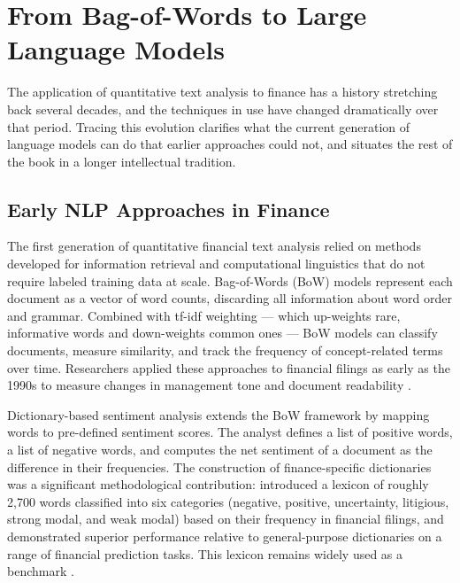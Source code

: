 \section{From Bag-of-Words to Large Language Models}
\label{sec:bow-to-llms}

The application of quantitative text analysis to finance has a history
stretching back several decades, and the techniques in use have changed
dramatically over that period.  Tracing this evolution clarifies what
the current generation of language models can do that earlier approaches
could not, and situates the rest of the book in a longer intellectual
tradition.

\subsection{Early NLP Approaches in Finance}
\label{subsec:early-nlp-finance}

The first generation of quantitative financial text analysis relied on
methods developed for information retrieval and computational linguistics
that do not require labeled training data at scale.  Bag-of-Words (BoW)
models represent each document as a vector of word counts, discarding
all information about word order and grammar.  Combined with tf-idf
weighting --- which up-weights rare, informative words and down-weights
common ones --- BoW models can classify documents, measure similarity,
and track the frequency of concept-related terms over time.
Researchers applied these approaches to financial filings as early as
the 1990s to measure changes in management tone and document readability
\parencite{kearney2014textual}.

Dictionary-based sentiment analysis extends the BoW framework by
mapping words to pre-defined sentiment scores.  The analyst defines
a list of positive words, a list of negative words, and computes the
net sentiment of a document as the difference in their frequencies.
The construction of finance-specific dictionaries was a significant
methodological contribution: \textcite{loughran2011liability} introduced
a lexicon of roughly 2,700 words classified into six categories
(negative, positive, uncertainty, litigious, strong modal, and weak modal)
based on their frequency in financial filings, and demonstrated superior
performance relative to general-purpose dictionaries on a range of
financial prediction tasks.  This lexicon remains widely used as a
benchmark \parencite{loughran2020textual}.

